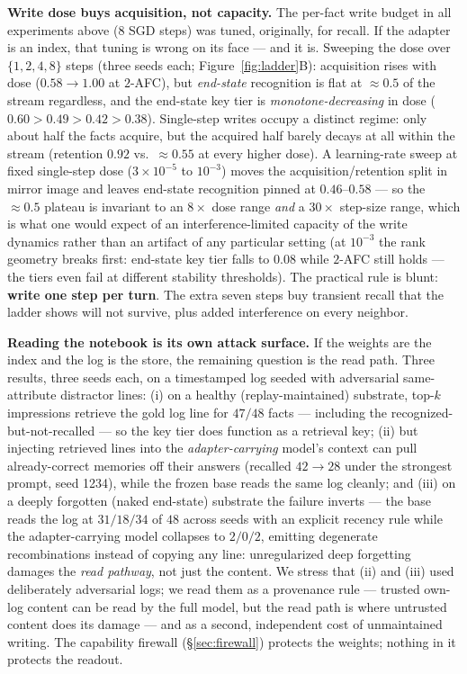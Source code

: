 \documentclass[11pt]{article}
\begin{document}
\textbf{Write dose buys acquisition, not capacity.} The per-fact write budget in all experiments
above ($8$ SGD steps) was tuned, originally, for recall. If the adapter is an index, that tuning
is wrong on its face --- and it is. Sweeping the dose over $\{1,2,4,8\}$ steps (three seeds each;
Figure~\ref{fig:ladder}B): acquisition rises with dose ($0.58\!\to\!1.00$ at $2$-AFC), but
\emph{end-state} recognition is flat at $\approx 0.5$ of the stream regardless, and the end-state
key tier is \emph{monotone-decreasing} in dose ($0.60 > 0.49 > 0.42 > 0.38$). Single-step writes
occupy a distinct regime: only about half the facts acquire, but the acquired half barely decays
at all within the stream (retention $0.92$ vs.\ $\approx\!0.55$ at every higher dose). A learning-rate
sweep at fixed single-step dose ($3\times10^{-5}$ to $10^{-3}$) moves the acquisition/retention
split in mirror image and leaves end-state recognition pinned at $0.46$--$0.58$ --- so the
$\approx 0.5$ plateau is invariant to an $8\times$ dose range \emph{and} a $30\times$ step-size
range, which is what one would expect of an interference-limited capacity of the write dynamics
rather than an artifact of any particular setting (at $10^{-3}$ the rank geometry breaks first:
end-state key tier falls to $0.08$ while $2$-AFC still holds --- the tiers even fail at different
stability thresholds). The practical rule is blunt: \textbf{write one step per turn}. The extra
seven steps buy transient recall that the ladder shows will not survive, plus added interference
on every neighbor.

\textbf{Reading the notebook is its own attack surface.} If the weights are the index and the log
is the store, the remaining question is the read path. Three results, three seeds each, on a
timestamped log seeded with adversarial same-attribute distractor lines: (i) on a healthy
(replay-maintained) substrate, top-$k$ impressions retrieve the gold log line for $47/48$ facts
--- including the recognized-but-not-recalled --- so the key tier does function as a retrieval
key; (ii) but injecting retrieved lines into the \emph{adapter-carrying} model's context can pull
already-correct memories off their answers (recalled $42 \to 28$ under the strongest prompt,
seed 1234),
while the frozen base reads the same log cleanly; and (iii) on a deeply forgotten (naked
end-state) substrate the failure inverts --- the base reads the log at $31/18/34$ of $48$
across seeds with an explicit
recency rule while the adapter-carrying model collapses to $2/0/2$, emitting degenerate
recombinations instead of copying any line: unregularized deep forgetting damages the
\emph{read pathway}, not just the content. We stress that (ii) and (iii) used deliberately
adversarial logs; we read them as a provenance rule --- trusted own-log content can be read by
the full model, but the read path is where untrusted content does its damage --- and as a second,
independent cost of unmaintained writing. The capability firewall (\S\ref{sec:firewall}) protects
the weights; nothing in it protects the readout.
\end{document}
